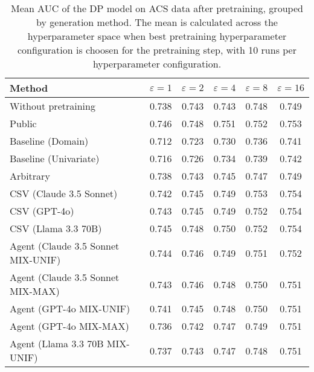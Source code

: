 \begin{table}[h!]
    \centering
    \caption{Mean AUC of the DP model on ACS data after pretraining, grouped by generation method. The mean is calculated across the hyperparameter space when best pretraining hyperparameter configuration is choosen for the pretraining step, with 10 runs per hyperparameter configuration.}
    \label{tab:epsilon_comparison}
    \begin{tabular}{lccccc}
    \toprule
    Method & $\varepsilon=1$ & $\varepsilon=2$ & $\varepsilon=4$ & $\varepsilon=8$ & $\varepsilon=16$ \\
    \midrule
    Without pretraining & 0.738 & 0.743 & 0.743 & 0.748 & 0.749 \\
    \arrayrulecolor{black!50!}\midrule
    Public & \cellcolor{gold!30}0.746 & \cellcolor{gold!30}0.748 & \cellcolor{gold!30}0.751 & \cellcolor{silver!30}0.752 & \cellcolor{silver!30}0.753 \\
    \arrayrulecolor{black!50!}\midrule
    Baseline (Domain) & 0.712 & 0.723 & 0.730 & 0.736 & 0.741 \\
    Baseline (Univariate) & 0.716 & 0.726 & 0.734 & 0.739 & 0.742 \\
    \arrayrulecolor{black!50!}\midrule
    Arbitrary & 0.738 & 0.743 & 0.745 & 0.747 & 0.749 \\
    \arrayrulecolor{black!50!}\midrule
    CSV (Claude 3.5 Sonnet) & 0.742 & 0.745 & \cellcolor{bronze!30}0.749 & \cellcolor{gold!30}0.753 & \cellcolor{gold!30}0.754 \\
    CSV (GPT-4o) & 0.743 & 0.745 & \cellcolor{bronze!30}0.749 & \cellcolor{silver!30}0.752 & \cellcolor{gold!30}0.754 \\
    CSV (Llama 3.3 70B) & \cellcolor{silver!30}0.745 & \cellcolor{gold!30}0.748 & \cellcolor{silver!30}0.750 & \cellcolor{silver!30}0.752 & \cellcolor{gold!30}0.754 \\
    \arrayrulecolor{black!50!}\midrule
    Agent (Claude 3.5 Sonnet MIX-UNIF) & \cellcolor{bronze!30}0.744 & \cellcolor{bronze!30}0.746 & \cellcolor{bronze!30}0.749 & \cellcolor{bronze!30}0.751 & \cellcolor{bronze!30}0.752 \\
    Agent (Claude 3.5 Sonnet MIX-MAX) & 0.743 & \cellcolor{bronze!30}0.746 & 0.748 & 0.750 & 0.751 \\
    Agent (GPT-4o MIX-UNIF) & 0.741 & 0.745 & 0.748 & 0.750 & 0.751 \\
    Agent (GPT-4o MIX-MAX) & 0.736 & 0.742 & 0.747 & 0.749 & 0.751 \\
    Agent (Llama 3.3 70B MIX-UNIF) & 0.737 & 0.743 & 0.747 & 0.748 & 0.751 \\

\end{tabular}
\end{table}
